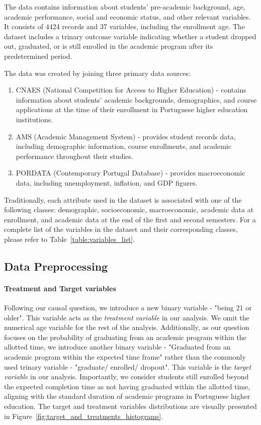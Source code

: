 \documentclass{article}
\begin{document}
The data contains information about students' pre-academic background, age, academic performance, social and economic status, and other relevant variables. It consists of 4424 records and 37 variables, including the enrollment age. The dataset includes a trinary outcome variable indicating whether a student dropped out, graduated, or is still enrolled in the academic program after its predetermined period.

The data was created by joining three primary data sources: 
\begin{enumerate}
    \item CNAES (National Competition for Access to Higher Education) - contains information about students' academic backgrounds, demographics, and course applications at the time of their enrollment in Portuguese higher education institutions.
    \item AMS (Academic Management System) - provides student records data, including demographic information, course enrollments, and academic performance throughout their studies.
    \item PORDATA (Contemporary Portugal Database) - provides macroeconomic data, including unemployment, inflation, and GDP figures.
\end{enumerate}

Traditionally, each attribute used in the dataset is associated with one of the following classes: demographic, socioeconomic, macroeconomic, academic data at enrollment, and academic data at the end of the first and second semesters. For a complete list of the variables in the dataset and their corresponding classes, please refer to Table~\ref{table:variables_list}.

\subsection{Data Preprocessing}

\paragraph{Treatment and Target variables} Following our causal question, we introduce a new binary variable - "being 21 or older". This variable acts as the \emph{treatment variable} in our analysis. We omit the numerical age variable for the rest of the analysis. Additionally, as our question focuses on the probability of graduating from an academic program within the allotted time, we introduce another binary variable - "Graduated from an academic program within the expected time frame" rather than the commonly used trinary variable - "graduate/ enrolled/ dropout". This variable is the \emph{target variable} in our analysis. Importantly, we consider students still enrolled beyond the expected completion time as not having graduated within the allotted time, aligning with the standard duration of academic programs in Portuguese higher education. The target and treatment variables distributions are visually presented in Figure~\ref{fig:target_and_treatments_histograms}.
\end{document}
